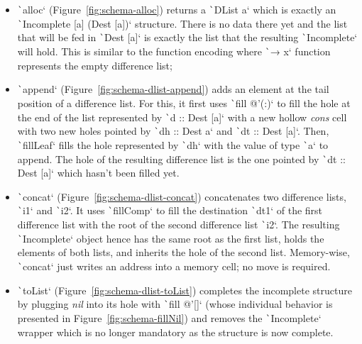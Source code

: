 \documentclass[english]{jflart}
\begin{document}


\begin{itemize}
  \item \texttt`alloc` (Figure~\ref{fig:schema-alloc}) returns a
    \texttt`DList a` which is exactly an
    \texttt`Incomplete [a] (Dest [a])` structure. There is no data
    there yet and the list that will be fed in \texttt`Dest [a]` is exactly the list that the
    resulting \texttt`Incomplete` will hold. This is
    similar to the function encoding where \texttt`\x → x` function represents the empty difference list;
    

  \item \texttt`append` (Figure~\ref{fig:schema-dlist-append}) adds an element at the tail
    position of a difference list. For this, it first uses
    \texttt`fill @'(:)` to fill the hole at the end of the list represented by
    \texttt`d :: Dest [a]` with a new hollow \emph{cons}
    cell with two new holes pointed by \texttt`dh :: Dest a` and \texttt`dt :: Dest [a]`. Then,
    \texttt`fillLeaf` fills the hole represented by
    \texttt`dh` with the value
    of type \texttt`a`
    to append. The hole of the resulting difference list is the one pointed by \texttt`dt :: Dest [a]` which hasn't been filled yet.

  \item \texttt`concat` (Figure~\ref{fig:schema-dlist-concat}) concatenates two difference lists,
    \texttt`i1` and \texttt`i2`. It uses \texttt`fillComp` to fill the destination \texttt`dt1`
    of the first difference list with the
    root of the second difference list \texttt`i2`. The resulting \texttt`Incomplete`
    object hence has the same root as the first list, holds the
    elements of both lists, and inherits the hole of the second list. Memory-wise,
    \texttt`concat` just writes an address into a memory cell; no move is
    required.

  \item \texttt`toList` (Figure~\ref{fig:schema-dlist-toList}) completes the incomplete structure by plugging \emph{nil} into its hole with \texttt`fill @'[]` (whose individual behavior is presented in Figure~\ref{fig:schema-fillNil}) and removes the \texttt`Incomplete` wrapper which is no longer mandatory as the structure is now complete.
\end{itemize}
\end{document}
